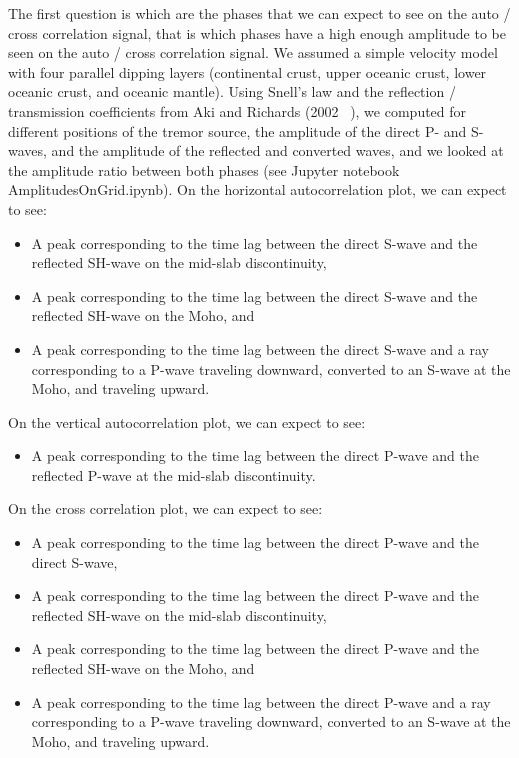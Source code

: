 \documentclass[workdone.tex]{subfiles}
\begin{document}
The first question is which are the phases that we can expect to see on the auto / cross correlation signal, that is which phases have a high enough amplitude to be seen on the auto / cross correlation signal. We assumed a simple velocity model with four parallel dipping layers (continental crust, upper oceanic crust, lower oceanic crust, and oceanic mantle). Using Snell's law and the reflection / transmission coefficients from Aki and Richards (2002 ~\cite{AKI_2002}), we computed for different positions of the tremor source, the amplitude of the direct P- and S-waves, and the amplitude of the reflected and converted waves, and we looked at the amplitude ratio between both phases (see Jupyter notebook AmplitudesOnGrid.ipynb). On the horizontal autocorrelation plot, we can expect to see:

\begin{itemize}
\item A peak corresponding to the time lag between the direct S-wave and the reflected SH-wave on the mid-slab discontinuity,
\item A peak corresponding to the time lag between the direct S-wave and the reflected SH-wave on the Moho, and
\item A peak corresponding to the time lag between the direct S-wave and a ray corresponding to a P-wave traveling downward, converted to an S-wave at the Moho, and traveling upward.
\end{itemize}

On the vertical autocorrelation plot, we can expect to see:
\begin{itemize}
\item A peak corresponding to the time lag between the direct P-wave and the reflected P-wave at the mid-slab discontinuity.
\end{itemize}

On the cross correlation plot, we can expect to see:
\begin{itemize}
\item A peak corresponding to the time lag between the direct P-wave and the direct S-wave,
\item A peak corresponding to the time lag between the direct P-wave and the reflected SH-wave on the mid-slab discontinuity,
\item A peak corresponding to the time lag between the direct P-wave and the reflected SH-wave on the Moho, and
\item A peak corresponding to the time lag between the direct P-wave and a ray corresponding to a P-wave traveling downward, converted to an S-wave at the Moho, and traveling upward.
\end{itemize}
\end{document}

